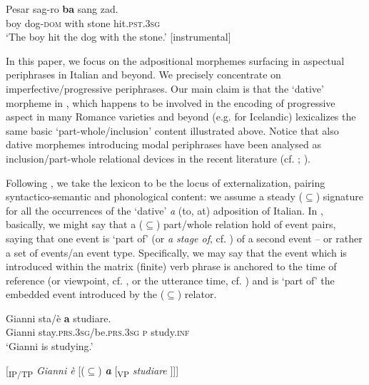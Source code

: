 \documentclass[output=paper,modfonts,nonflat,newtxmath,colorlinks,citecolor=brown]{langsci/langscibook}
\begin{document}
     \ex  \label{ex:franco:7b}
    \gll Pesar sag-ro  \textbf{ba} sang zad.\\
        boy dog-\textsc{dom}  with   stone   hit.\textsc{pst.3sg} \\
    \glt ‘The boy hit the dog with the stone.’ \hfill [instrumental]
    \z
    \z

In this paper, we focus on the adpositional morphemes surfacing in aspectual periphrases in Italian and beyond. We precisely concentrate on imperfective/progressive periphrases. Our main claim is that the ‘dative’ morpheme in , which happens to be involved in the encoding of progressive aspect in many Romance varieties \citep{ManziniLorussoSavoia2017} and beyond (e.g. \citealt{Johannsdottir2011} for Icelandic) lexicalizes the same basic ‘part-whole/inclusion’ content illustrated above. Notice that also dative morphemes introducing modal periphrases have been analysed as inclusion/part-whole relational devices in the recent literature (cf. \citealt{BjorkmanCowper2016}; ).

Following \citet{BerwickChomsky2011}, we take the lexicon to be the locus of externalization, pairing syntactico-semantic and phonological content: we assume a steady (${\subseteq}$) signature for all the occurrences of the ‘dative’ \textit{a} (to, at) adposition of Italian. In , basically, we might say that a (${\subseteq}$) part/whole relation hold of event pairs, saying that one event is ‘part of’ (or \textit{a stage of}, cf. \citealt{Landman1992}) of a second event – or rather a set of events/an event type. Specifically, we may say that the event which is introduced within the matrix (finite) verb phrase is anchored to the time of reference (or viewpoint, cf. \citealt{Comrie1976}, or the utterance time, cf. \citealt{Higginbotham2009}) and is ‘part of’ the embedded event introduced by the (${\subseteq}$) relator. %

\ea%
    \label{ex:franco:8}
    \ea \label{ex:franco:8a}
    \gll Gianni sta/è \textbf{a} studiare.\\
        Gianni stay.\textsc{prs.3sg}/be.\textsc{prs.3sg} \textsc{p} study.\textsc{inf}\\
    \glt ‘Gianni is studying.’

     \ex \label{ex:franco:8b}
     {[}\textsubscript{IP/TP} \textit{Gianni è} [(${\subseteq}$) \textit{\textbf{a}} [\textsubscript{VP} \textit{studiare} {]]]}
    \z
    \z
\end{document}
